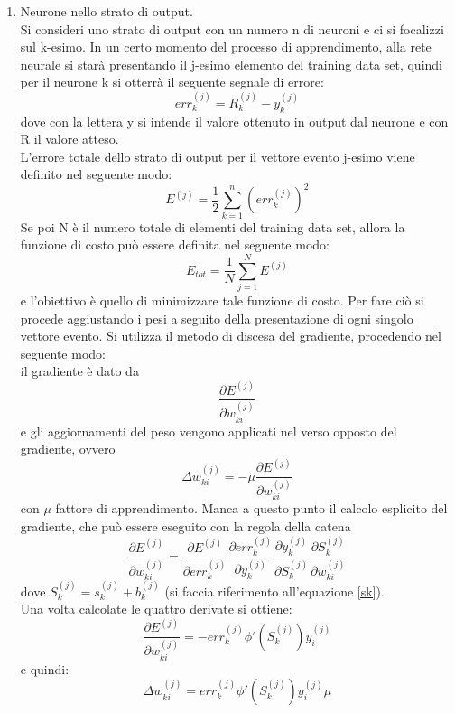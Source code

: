 \begin{enumerate}
	\item Neurone nello strato di output.\\
	Si consideri uno strato di output con un numero n di neuroni e ci si focalizzi sul k-esimo. In un certo momento del processo di apprendimento, alla rete neurale si starà presentando il j-esimo elemento del training data set, quindi per il neurone k si otterrà il seguente segnale di errore:
	\begin{equation}
	err_k^{(j)} = R_k^{(j)} - y_k^{(j)}
	\end{equation}
	dove con la lettera y si intende il valore ottenuto in output dal neurone e con R il valore atteso. \\
	L'errore totale dello strato di output per il vettore evento j-esimo viene definito nel seguente modo:
	\begin{equation}
	E^{(j)} = \frac{1}{2} \sum_{k=1}^{n} (err_k^{(j)})^2
	\end{equation}
	Se poi N è il numero totale di elementi del training data set, allora la funzione di costo può essere definita nel seguente modo:
	\begin{equation}
	E_{tot} = \frac{1}{N}\sum_{j=1}^{N} E^{(j)}
	\end{equation}
	e l'obiettivo è quello di minimizzare tale funzione di costo. Per fare ciò si procede aggiustando i pesi a seguito della presentazione di ogni singolo vettore evento.
	Si utilizza il metodo di discesa del gradiente, procedendo nel seguente modo: \\
	il gradiente è dato da
	\begin{equation}
	\frac{\partial E^{(j)} }{\partial w_{ki}^{(j)}}
	\end{equation}
	e gli aggiornamenti del peso vengono applicati nel verso opposto del gradiente, ovvero
	\begin{equation}
	\Delta w_{ki}^{(j)} = -\mu \frac{\partial E^{(j)} }{\partial w_{ki}^{(j)}}
	\end{equation}
	con $\mu$ fattore di apprendimento.
	Manca a questo punto il calcolo esplicito del gradiente, che può essere eseguito con la regola della catena 
	\begin{equation}
	\frac{\partial E^{(j)} }{\partial w_{ki}^{(j)}} = \frac{\partial E^{(j)}}{\partial err_k^{(j)}}
	\frac{\partial err_k^{(j)}}{\partial y_k^{(j)}}
	\frac{\partial y_k^{(j)}}{\partial S_k^{(j)}}
	\frac{\partial S_k^{(j)}}{\partial w_{ki}^{(j)}}
	\end{equation}
	dove $S_k^{(j)} = s_k^{(j)} + b_k^{(j)} $ (si faccia riferimento all'equazione \eqref{sk}). \\
	Una volta calcolate le quattro derivate si ottiene:
	\begin{equation}
	\frac{\partial E^{(j)} }{\partial w_{ki}^{(j)}} =
	-err_k^{(j)}\phi'(S_k^{(j)})y_i^{(j)}
	\end{equation}
	e quindi:
	\begin{equation}
	\Delta w_{ki}^{(j)} = err_k^{(j)}\phi'(S_k^{(j)})y_i^{(j)} \mu
	\end{equation}
	

\end{enumerate}
